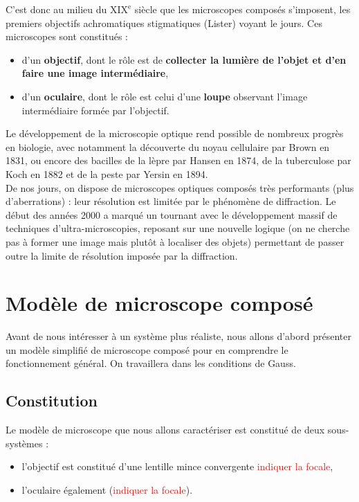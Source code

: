 \documentclass[11pt,a4paper]{report}
\begin{document}
C'est donc au milieu du $\text{XIX}^\text{e}$ siècle que les microscopes composés s'imposent, les premiers objectifs achromatiques stigmatiques (Lister) voyant le jours. Ces microscopes sont constitués :
\begin{itemize}
	\item d'un \textbf{objectif}, dont le rôle est de \textbf{collecter la lumière de l'objet et d'en 		faire une image intermédiaire},
	\item d'un \textbf{oculaire}, dont le rôle est celui d'une \textbf{loupe} observant l'image 				intermédiaire formée par l'objectif.\\
\end{itemize}

Le développement de la microscopie optique rend possible de nombreux progrès en biologie, avec notamment la découverte du noyau cellulaire par Brown en 1831, ou encore des bacilles de la lèpre par Hansen en 1874, de la tuberculose par Koch en 1882 et de la peste par Yersin en 1894.\\

De nos jours, on dispose de microscopes optiques composés très performants (plus d'aberrations) : leur résolution est limitée par le phénomène de diffraction. Le début des années 2000 a marqué un tournant avec le développement massif de techniques d'ultra-microscopies, reposant sur une nouvelle logique (on ne cherche pas à former une image mais plutôt à localiser des objets) permettant de passer outre la limite de résolution imposée par la diffraction.

\newpage
\section{Modèle de microscope composé}

Avant de nous intéresser à un système plus réaliste, nous allons d'abord présenter un modèle simplifié de microscope composé pour en comprendre le fonctionnement général. On travaillera dans les conditions de Gauss.

\subsection{Constitution}

Le modèle de microscope que nous allons caractériser est constitué de deux sous-systèmes :
\begin{itemize}
	\item l'objectif est constitué d'une lentille mince convergente 
		\textcolor{red}{indiquer la focale},
	\item l'oculaire également (\textcolor{red}{indiquer la focale}).\\
\end{itemize}
\end{document}
